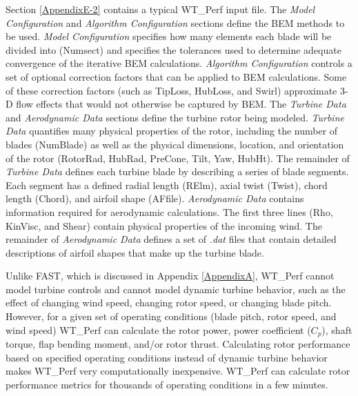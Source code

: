 Section \ref{AppendixE-2} contains a typical WT\_Perf input file. The \textit{Model Configuration} and \textit{Algorithm Configuration} sections define the BEM methods to be used. \textit{Model Configuration} specifies how many elements each blade will be divided into (Numsect) and specifies the tolerances used to determine adequate convergence of the iterative BEM calculations. \textit{Algorithm Configuration} controls a set of optional correction factors that can be applied to BEM calculations. Some of these correction factors (such as TipLoss, HubLoss, and Swirl) approximate 3-D flow effects that would not otherwise be captured by BEM. The \textit{Turbine Data} and \textit{Aerodynamic Data} sections define the turbine rotor being modeled. \textit{Turbine Data} quantifies many physical properties of the rotor, including the number of blades (NumBlade) as well as the physical dimensions, location, and orientation of the rotor (RotorRad, HubRad, PreCone, Tilt, Yaw, HubHt). The remainder of \textit{Turbine Data} defines each turbine blade by describing a series of blade segments. Each segment has a defined radial length (RElm), axial twist (Twist), chord length (Chord), and airfoil shape (AFfile). \textit{Aerodynamic Data} contains information required for aerodynamic calculations. The first three lines (Rho, KinVisc, and Shear) contain physical properties of the incoming wind. The remainder of \textit{Aerodynamic Data} defines a set of \textit{.dat} files that contain detailed descriptions of airfoil shapes that make up the turbine blade. 

Unlike FAST, which is discussed in Appendix \ref{AppendixA}, WT\_Perf cannot model turbine controls and cannot model dynamic turbine behavior, such as the effect of changing wind speed, changing rotor speed, or changing blade pitch. However, for a given set of operating conditions (blade pitch, rotor speed, and wind speed) WT\_Perf can calculate the rotor power, power coefficient ($C_p$), shaft torque, flap bending moment, and/or rotor thrust. Calculating rotor performance based on specified operating conditions instead of dynamic turbine behavior makes WT\_Perf very computationally inexpensive. WT\_Perf can calculate rotor performance metrics for thousands of operating conditions in a few minutes.  

